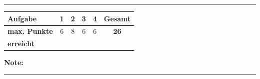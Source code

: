 \documentclass[11pt, a4paper]{article}
\newcommand{\luecke}[1]{\rule{#1}{0.4pt}}
\begin{document}

\vspace{25pt}
\hrule
\vspace{10pt}

\noindent
\begin{tabularx}{\textwidth}{|X|c|c|c|c||c|}
\hline
\textbf{Aufgabe} & 1 & 2 & 3 & 4 & \textbf{Gesamt} \\
\hline
\textbf{max. Punkte} & 6 & 8 & 6 & 6 & \textbf{26} \\
\hline
\textbf{erreicht} & & & & & \\[0.8em]
\hline
\end{tabularx}

\vspace{10pt}

\begin{flushright}
\textbf{Note:} \luecke{2cm}
\end{flushright}
\end{document}
